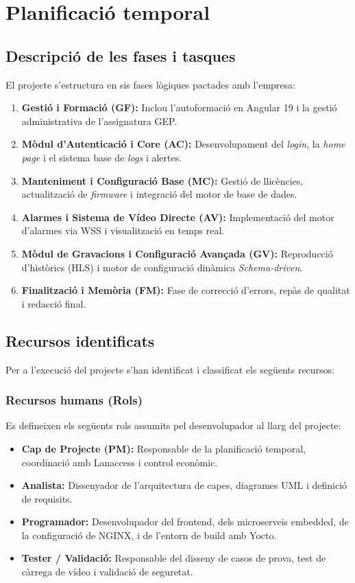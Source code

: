 \section{Planificació temporal}

\subsection{Descripció de les fases i tasques}
El projecte s'estructura en sis fases lògiques pactades amb l'empresa:

\begin{enumerate}
  \item \textbf{Gestió i Formació (GF):} Inclou l'autoformació en Angular 19 i la gestió administrativa de l'assignatura GEP.
  \item \textbf{Mòdul d'Autenticació i Core (AC):} Desenvolupament del \textit{login}, la \textit{home page} i el sistema base de \textit{logs} i alertes.
  \item \textbf{Manteniment i Configuració Base (MC):} Gestió de llicències, actualització de \textit{firmware} i integració del motor de base de dades.
  \item \textbf{Alarmes i Sistema de Vídeo Directe (AV):} Implementació del motor d'alarmes via WSS i visualització en temps real.
  \item \textbf{Mòdul de Gravacions i Configuració Avançada (GV):} Reproducció d'històrics (HLS) i motor de configuració dinàmica \textit{Schema-driven}.
  \item \textbf{Finalització i Memòria (FM):} Fase de correcció d'errors, repàs de qualitat i redacció final.
\end{enumerate}

\subsection{Recursos identificats}
Per a l'execució del projecte s'han identificat i classificat els següents recursos:

\subsubsection{Recursos humans (Rols)}
Es defineixen els següents rols assumits pel desenvolupador al llarg del projecte:
\begin{itemize}
  \item \textbf{Cap de Projecte (PM):} Responsable de la planificació temporal, coordinació amb Lanaccess i control econòmic.
  \item \textbf{Analista:} Dissenyador de l'arquitectura de capes, diagrames UML i definició de requisits.
  \item \textbf{Programador:} Desenvolupador del frontend, dels microserveis embedded, de la configuració de NGINX, i de l'entorn de build amb Yocto.
  \item \textbf{Tester / Validació:} Responsable del disseny de casos de prova, test de càrrega de vídeo i validació de seguretat.
\end{itemize}

